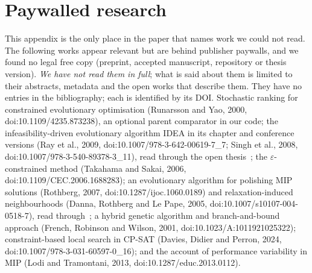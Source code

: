 \section{Paywalled research}\label{app:paywalled}
This appendix is the only place in the paper that names work we could not read. The following works appear relevant
but are behind publisher paywalls, and we found no legal free copy (preprint, accepted manuscript, repository or thesis
version). \emph{We have not read them in full}; what is said about them is limited to their abstracts, metadata and the
open works that describe them. They have no entries in the bibliography; each is identified by its DOI.
Stochastic ranking for constrained evolutionary optimisation (Runarsson and Yao, 2000, doi:10.1109/4235.873238), an
optional parent comparator in our code; the infeasibility-driven evolutionary algorithm IDEA in its chapter and
conference versions (Ray et al., 2009, doi:10.1007/978-3-642-00619-7\_7; Singh et al., 2008,
doi:10.1007/978-3-540-89378-3\_11), read through the open thesis~\citep{singh2011thesis}; the $\varepsilon$-constrained
method (Takahama and Sakai, 2006, doi:10.1109/CEC.2006.1688283); an evolutionary algorithm for polishing MIP solutions
(Rothberg, 2007, doi:10.1287/ijoc.1060.0189) and relaxation-induced neighbourhoods (Danna, Rothberg and Le Pape, 2005,
doi:10.1007/s10107-004-0518-7), read through~\citep{berthold2006primal}; a hybrid genetic algorithm and branch-and-bound
approach (French, Robinson and Wilson, 2001, doi:10.1023/A:1011921025322); constraint-based local search in CP-SAT
(Davies, Didier and Perron, 2024, doi:10.1007/978-3-031-60597-0\_16); and the account of performance variability in MIP
(Lodi and Tramontani, 2013, doi:10.1287/educ.2013.0112). 
